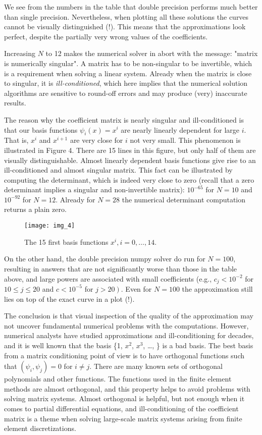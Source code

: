 \documentclass[../main.tex]{subfiles}
\begin{document}
	\noindent We see from the numbers in the table that double precision performs much better than single precision. Nevertheless, when plotting all these solutions the curves cannot be visually distinguished (!). This means that the approximations look perfect, despite the partially very wrong values of the coefficients.
	
	Increasing $N$ to 12 makes the numerical solver in  abort with the message: "matrix is numerically singular". A matrix has to be non-singular to be invertible, which is a requirement when solving a linear system. Already when the matrix is close to singular, it is \textit{ill-conditioned}, which here implies that the numerical solution algorithms are sensitive to round-off errors and may produce (very) inaccurate results.
	
	The reason why the coefficient matrix is nearly singular and ill-conditioned is that our basis functions $\psi_{i}(x)=x^{i}$ are nearly linearly dependent for large $i$. That is, $x^{i}$ and $x^{i+1}$ are very close for $i$ not very small. This phenomenon is illustrated in Figure 4. There are 15 lines in this figure, but only half of them are visually distinguishable. Almost linearly dependent basis functions give rise to an ill-conditioned and almost singular matrix. This fact can be illustrated by computing the determinant, which is indeed very close to zero (recall that a zero determinant implies a singular and non-invertible matrix): $10^{-65}$ for $N=10$ and $10^{-92}$ for $N=12$. Already for $N=28$ the numerical determinant computation returns a plain zero.
	\begin{figure}[H]
		\centering
		\texttt{[image: img\_4]}
		\caption{The 15 first basis functions $x^{i}, i=0, \ldots, 14$.}
		\label{fig:img_4}
	\end{figure}
	On the other hand, the double precision numpy solver do run for $N=100$, resulting in answers that are not significantly worse than those in the table above, and large powers are associated with small coefficients (e.g., $c_{j}<10^{-2}$ for $10 \leq j \leq 20$ and $c<10^{-5}$ for $\left.j>20\right)$. Even for $N=100$ the approximation still lies on top of the exact curve in a plot (!).
	
	The conclusion is that visual inspection of the quality of the approximation may not uncover fundamental numerical problems with the computations. However, numerical analysts have studied approximations and ill-conditioning for decades, and it is well known that the basis \{1, $x^{2}$, $x^{3}$, \ldots, \} is a bad basis. The best basis from a matrix conditioning point of view is to have orthogonal functions such that $\left(\psi_{i}, \psi_{j}\right)=0$ for $i \neq j$. There are many known sets of orthogonal polynomials and other functions. The functions used in the finite element methods are almost orthogonal, and this property helps to avoid problems with solving matrix systems. Almost orthogonal is helpful, but not enough when it comes to partial differential equations, and ill-conditioning of the coefficient matrix is a theme when solving large-scale matrix systems arising from finite element discretizations.
	\bigbreak
\end{document}
